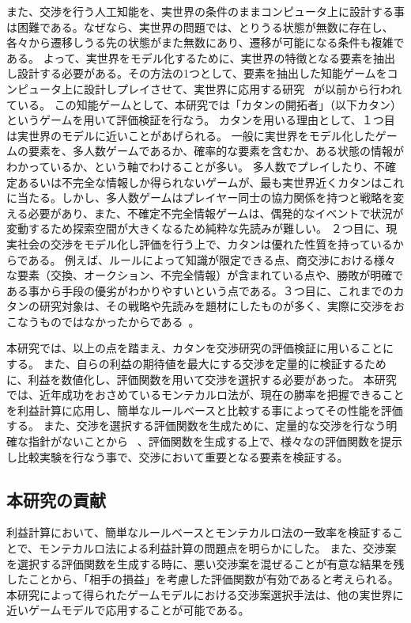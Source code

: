 \documentclass[a4, 10pt,dvipdfmx]{jsarticle}
\begin{document}
また、交渉を行う人工知能を、実世界の条件のままコンピュータ上に設計する事は困難である。なぜなら、実世界の問題では、とりうる状態が無数に存在し、各々から遷移しうる先の状態がまた無数にあり、遷移が可能になる条件も複雑である。
よって、実世界をモデル化するために、実世界の特徴となる要素を抽出し設計する必要がある。その方法の1つとして、要素を抽出した知能ゲームをコンピュータ上に設計しプレイさせて、実世界に応用する研究 ~\cite{川越敏司2010行動ゲーム理論入門}が以前から行われている。
この知能ゲームとして、本研究では「カタンの開拓者」（以下カタン）というゲームを用いて評価検証を行なう。
カタンを用いる理由として、１つ目は実世界のモデルに近いことがあげられる。
一般に実世界をモデル化したゲームの要素を、多人数ゲームであるか、確率的な要素を含むか、ある状態の情報がわかっているか、という軸でわけることが多い。
多人数でプレイしたり、不確定あるいは不完全な情報しか得られないゲームが、最も実世界近くカタンはこれに当たる。しかし、多人数ゲームはプレイヤー同士の協力関係を持つと戦略を変える必要があり、また、不確定不完全情報ゲームは、偶発的なイベントで状況が変動するため探索空間が大きくなるため純粋な先読みが難しい。
２つ目に、現実社会の交渉をモデル化し評価を行う上で、カタンは優れた性質を持っているからである。
例えば、ルールによって知識が限定できる点、商交渉における様々な要素（交換、オークション、不完全情報）が含まれている点や、勝敗が明確である事から手段の優劣がわかりやすいという点である。３つ目に、これまでのカタンの研究対象は、その戦略や先読みを題材にしたものが多く、実際に交渉をおこなうものではなかったからである~\cite{kocsis2006bandit,schadd2009monte}。

本研究では、以上の点を踏まえ、カタンを交渉研究の評価検証に用いることにする。
また、自らの利益の期待値を最大にする交渉を定量的に検証するために、利益を数値化し、評価関数を用いて交渉を選択する必要があった。
本研究では、近年成功をおさめているモンテカルロ法が、現在の勝率を把握できることを利益計算に応用し、簡単なルールベースと比較する事によってその性能を評価する。
また、交渉を選択する評価関数を生成ために、定量的な交渉を行なう明確な指針がないことから ~\cite{安村禎明2002モノポリーゲームにおける交渉エージェント}、評価関数を生成する上で、様々なの評価関数を提示し比較実験を行なう事で、交渉において重要となる要素を検証する。


\subsection{本研究の貢献}

利益計算において、簡単なルールベースとモンテカルロ法の一致率を検証することで、モンテカルロ法による利益計算の問題点を明らかにした。
また、交渉案を選択する評価関数を生成する時に、悪い交渉案を混ぜることが有意な結果を残したことから、「相手の損益」を考慮した評価関数が有効であると考えられる。
本研究によって得られたゲームモデルにおける交渉案選択手法は、他の実世界に近いゲームモデルで応用することが可能である。
\end{document}
